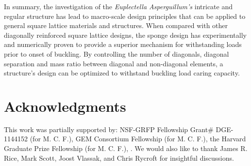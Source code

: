\documentclass[9pt,twocolumn,twoside]{fernandes_paper}
\newcommand{\mf}[1]{\noindent\color{orange}{$\Longrightarrow$#1}\normalcolor}
\begin{document}


\mf{write section on Optimization here}

In summary, the investigation of the \textit{Euplectella Asperguillum's} intricate and regular structure has lead to macro-scale design principles that can be applied to general square lattice materials and structures. When compared with other diagonally reinforced square lattice designs, the sponge design has experimentally and numerically proven to provide a superior mechanism for withstanding loads prior to onset of buckling. By controlling the number of diagonals, diagonal separation and mass ratio between diagonal and non-diagonal elements, a structure's design can be optimized to withstand buckling load caring capacity. 

\section*{Acknowledgments}
 \noindent This work was partially supported by: NSF-GRFP Fellowship  Grant\# DGE-1144152 (for M. C. F.), GEM Consortium Fellowship (for M. C. F.), the Harvard Graduate Prize Fellowship (for M. C. F.), \mf{add whatever else here}.
 We would also like to thank James R. Rice, Mark Scott, Joost Vlassak, and Chris Rycroft for insightful discussions.
\end{document}
